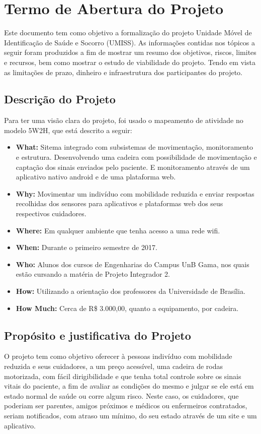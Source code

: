\chapter{Termo de Abertura do Projeto}
Este documento tem como objetivo a formalização do projeto Unidade Móvel de
Identificação de Saúde e Socorro (UMISS). As informações contidas nos tópicos 
a seguir foram produzidos a fim de mostrar um resumo dos objetivos, riscos, 
limites e recursos, bem como mostrar o estudo de viabilidade do projeto. 
Tendo em vista as limitações de prazo, dinheiro e infraestrutura dos 
participantes do projeto.
\section{Descrição do Projeto}
Para ter uma visão clara do projeto, foi usado o mapeamento de atividade no 
modelo 5W2H, que está descrito a seguir:

\begin{itemize}
    \item \textbf{What:} Sitema integrado com subsistemas de movimentação,
    monitoramento e estrutura. Desenvolvendo uma cadeira com possibilidade
    de movimentação e captação dos sinais enviados pelo paciente. E monitoramento
    através de um aplicativo nativo android e de uma plataforma web.
    \item \textbf{Why:} Movimentar um indivíduo com mobilidade reduzida
    e enviar respostas recolhidas
    dos sensores para aplicativos e plataformas web dos seus respectivos
    cuidadores.
    \item \textbf{Where:} Em qualquer ambiente que tenha acesso a uma rede wifi.
    \item \textbf{When:} Durante o primeiro semestre de 2017.
    \item \textbf{Who:} Alunos dos cursos de Engenharias do Campus UnB Gama, nos
    quais estão cursando a matéria de Projeto Integrador 2.
    \item \textbf{How:} Utilizando a orientação dos professores da Universidade
    de Brasília.
    \item \textbf{How Much:} Cerca de R\$ 3.000,00, quanto a equipamento, por
    cadeira.
\end{itemize}

\section{Propósito e justificativa do Projeto}
O projeto tem como objetivo oferecer à pessoas indivíduo com mobilidade reduzida
e seus cuidadores,
a um preço acessível, uma cadeira de rodas motorizada, com fácil dirigibilidade 
e que tenha total controle sobre os sinais vitais do paciente, a fim de avaliar 
as condições do mesmo e julgar se ele está em estado normal de saúde ou corre 
algum risco. Neste caso, os cuidadores, que poderiam ser parentes, amigos 
próximos e médicos ou enfermeiros contratados, seriam notificados, com atraso 
um mínimo, do seu estado através de um site e um aplicativo.

